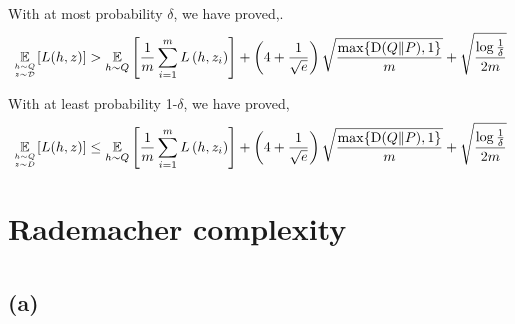 \documentclass{article}
\begin{document}
With at most probability $\delta$, we have proved,.
\begin{equation}
    \underset{h \sim Q \atop z \sim \mathcal{D}}{\mathbb{E}}[L(h, z)] > \underset{h \sim Q}{\mathbb{E}}\left[\frac{1}{m} \sum_{i=1}^{m} L\left(h, z_{i}\right)\right]+\left(4+\frac{1}{\sqrt{e}}\right) \sqrt{\frac{\max \{\mathrm{D}(Q \| P), 1\}}{m}}+\sqrt{\frac{\log \frac{1}{\delta}}{2 m}}
\end{equation}

With at least probability 1-$\delta$, we have proved,
\begin{equation}
    \underset{h \sim Q \atop z \sim D}{\mathbb{E}}[L(h, z)] \leq \underset{h \sim Q}{\mathbb{E}}\left[\frac{1}{m} \sum_{i=1}^{m} L\left(h, z_{i}\right)\right]+\left(4+\frac{1}{\sqrt{e}}\right) \sqrt{\frac{\max \{\mathrm{D}(Q \| P), 1\}}{m}}+\sqrt{\frac{\log \frac{1}{\delta}}{2 m}}\label{eq:final_target}
\end{equation}


\newpage
\section*{Rademacher complexity}
\section{}
\subsection{(a)}
\end{document}
